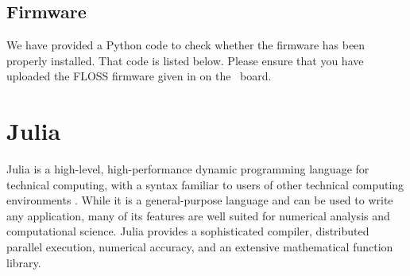 \subsection{Firmware}
\lstset{style=mystyle}
\label{sec:test-firmware-python}
We have provided a Python code to check whether the firmware has been properly installed. That code is listed below.  
Please ensure that you have uploaded the FLOSS firmware given in  on the \arduino\ board.

\begin{pycode}
      \label{py:test-firmware}
      
\end{pycode}





\section{Julia} \label{sec:julia-start}
Julia is a high-level, high-performance dynamic programming language for 
technical computing, with a syntax familiar to users of other technical computing 
environments \cite{julia-ref}. While it is a general-purpose language and can be used to write any 
application, many of its features are well suited for numerical analysis and 
computational science. Julia provides a sophisticated compiler, distributed 
parallel execution, numerical accuracy, and an extensive mathematical function
library. 


